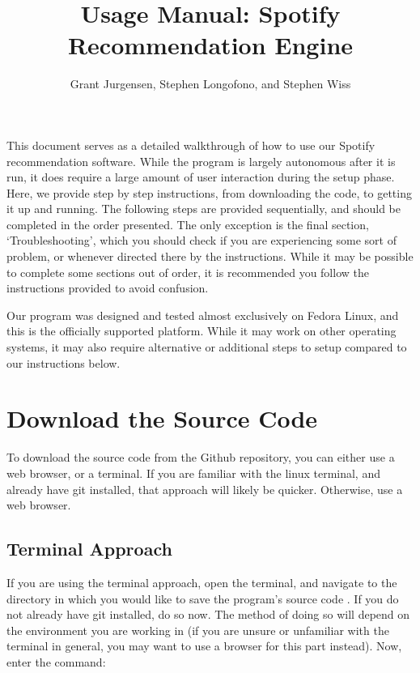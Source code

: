 \documentclass{roffin}
\begin{document}
\title{Usage Manual: Spotify Recommendation Engine}

\author{Grant Jurgensen, Stephen Longofono, and Stephen Wiss}

\maketitle

This document serves as a detailed walkthrough of how to use our Spotify recommendation software. While the program is largely autonomous after it is run, it does require a large amount of user interaction during the setup phase. Here, we provide step by step instructions, from downloading the code, to getting it up and running. The following steps are provided sequentially, and should be completed in the order presented. The only exception is the final section, `Troubleshooting', which you should check if you are experiencing some sort of problem, or whenever directed there by the instructions. While it may be possible to complete some sections out of order, it is recommended you follow the instructions provided to avoid confusion.

Our program was designed and tested almost exclusively on Fedora Linux, and this is the officially supported platform. While it may work on other operating systems, it may also require alternative or additional steps to setup compared to our instructions below.

\section{Download the Source Code}
To download the source code from the Github repository, you can either use a web browser, or a terminal. If you are familiar with the linux terminal, and already have git installed, that approach will likely be quicker. Otherwise, use a web browser.

\subsection{Terminal Approach}
If you are using the terminal approach, open the terminal, and navigate to the directory in which you would like to save the program's source code . If you do not already have git installed, do so now. The method of doing so will depend on the environment you are working in (if you are unsure or unfamiliar with the terminal in general, you may want to use a browser for this part instead). Now, enter the command:
\newline
\end{document}
